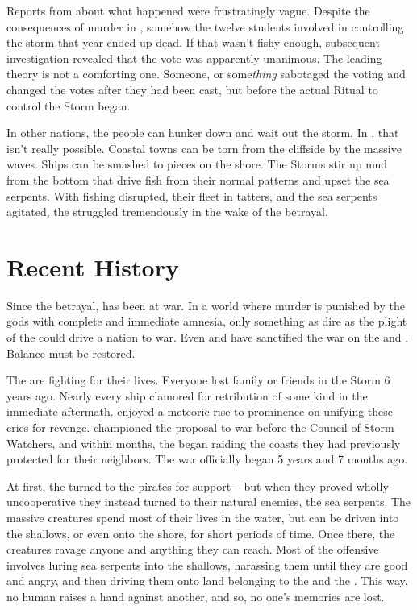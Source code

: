 \documentclass[blue]{GL2020}
\begin{document}
Reports from \pSchool{} about what happened were frustratingly vague. Despite the consequences of murder in \pEarth{}, somehow the twelve students involved in controlling the storm that year ended up dead. If that wasn't fishy enough, subsequent investigation revealed that the vote was apparently unanimous. The leading theory is not a comforting one. Someone, or some\emph{thing} sabotaged the voting and changed the votes after they had been cast, but before the actual Ritual to control the Storm began.

In other nations, the people can hunker down and wait out the storm. In \pShip{}, that isn’t really possible. Coastal towns can be torn from the cliffside by the massive waves. Ships can be smashed to pieces on the shore. The Storms stir up mud from the bottom that drive fish from their normal patterns and upset the sea serpents. With fishing disrupted, their fleet in tatters, and the sea serpents agitated, the \pShip{} struggled tremendously in the wake of the betrayal.

\section*{Recent History}
Since the betrayal, \pEarth{} has been at war. In a world where murder is punished by the gods with complete and immediate amnesia, only something as dire as the plight of the \pShippies{} could drive a nation to war. Even \cEbbFull{} and \cFlowFull{} have sanctified the war on the \pFarm{} and \pTech{}. Balance must be restored.

The \pShip{} are fighting for their lives. Everyone lost family or friends in the Storm 6 years ago. Nearly every ship clamored for retribution of some kind in the immediate aftermath. \cLoud{\full} enjoyed a meteoric rise to prominence on unifying these cries for revenge. \cLoud{\They} championed the proposal to war before the Council of Storm Watchers, and within months, the \pShip{} began raiding the coasts they had previously protected for their neighbors. The war officially began 5 years and 7 months ago. 

At first, the \pShippies{} turned to the pirates for support -- but when they proved wholly uncooperative they instead turned to their natural enemies, the sea serpents. The massive creatures spend most of their lives in the water, but can be driven into the shallows, or even onto the shore, for short periods of time. Once there, the creatures ravage anyone and anything they can reach. Most of the \pShip{} offensive involves luring sea serpents into the shallows, harassing them until they are good and angry, and then driving them onto land belonging to the \pFarm{} and the \pTech{}. This way, no human raises a hand against another, and so, no one’s memories are lost.
\end{document}
